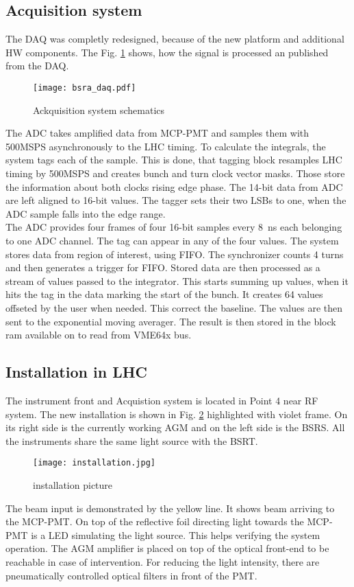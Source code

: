 \subsection{Acquisition system}
The DAQ was completly redesigned, because of the new platform and additional HW
components. The Fig. \ref{fig:bsra_daq} shows, how the signal is processed an
published from the DAQ.
\begin{figure}[!tbh]
    \centering
    \texttt{[image: bsra\_daq.pdf]}
    \caption{Ackquisition system schematics}
    \label{fig:bsra_daq}
\end{figure}
The ADC takes amplified data from MCP-PMT and samples them with 500MSPS
asynchronously to the LHC timing. To calculate the integrals, the system tags
each of the sample. This is done, that tagging block resamples LHC timing by
500MSPS and creates bunch and turn clock vector masks. Those store the
information about both clocks rising edge phase. The 14-bit data from ADC are
left aligned to 16-bit values. The tagger sets their two LSBs to one, when the
ADC sample falls into the edge range. \\
The ADC provides four frames of four 16-bit samples every \SI{8}{\nano s} each
belonging to one ADC channel. The tag can appear in any of the four values. The
system stores data from region of interest, using FIFO. The synchronizer counts
4 turns and then generates a trigger for FIFO. Stored data are then processed as
a stream of values passed to the integrator. This starts summing up values,
when it hits the tag in the data marking the start of the bunch. It creates 64
values offseted by the user when needed. This correct the baseline. The values
are then sent to the exponential moving averager. The result is then stored in
the block ram available on to read from VME64x bus.

\subsection{Installation in LHC}
The instrument front and Acquistion system is located in Point 4 near RF
system. The new installation is shown in Fig. \ref{fig:installation}
highlighted with violet frame. On its right side is the currently working AGM
and on the left side is the BSRS. All the instruments share the same light
source with the BSRT. 
\begin{figure}[!tbh]
    \centering
    \texttt{[image: installation.jpg]}
    \caption{installation picture}
    \label{fig:installation}
\end{figure}
The beam input is demonstrated by the yellow line. It shows beam arriving to
the MCP-PMT. On top of the reflective foil directing light towards the MCP-PMT
is a LED simulating the light source. This helps verifying the system
operation. The AGM amplifier is placed on top of the optical front-end to be
reachable in case of intervention. For reducing the light intensity, there are
pneumatically controlled optical filters in front of the PMT. 

